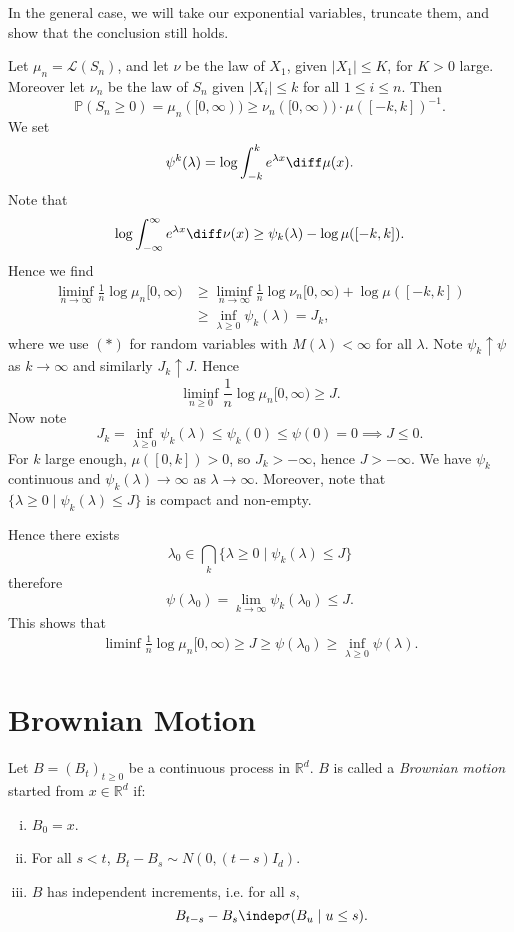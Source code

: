 \documentclass[12pt]{article}
\begin{document}
\begin{proofbox}
	In the general case, we will take our exponential variables, truncate them, and show that the conclusion still holds.

	Let $\mu_n = \mathcal{L}(S_n)$, and let $\nu$ be the law of $X_1$, given $|X_1| \leq K$, for $K > 0$ large. Moreover let $\nu_n$ be the law of $S_n$ given $|X_i| \leq k$ for all $1 \leq i \leq n$. Then
	\[
		\mathbb{P}(S_n \geq 0) = \mu_n([0, \infty)) \geq \nu_n([0, \infty)) \cdot \mu([-k, k])^{-1}.
	\]
	We set
	\[
	\psi^{k}(\lambda) = \log \int_{-k}^k e^{\lambda x} \diff \mu(x).
	\]
	Note that
	\[
		\log \int_{-\infty}^{\infty} e^{\lambda x} \diff \nu(x) \geq \psi_k(\lambda) - \log \mu([-k,k]).
	\]
	Hence we find
	\begin{align*}
		\liminf_{n \to \infty} \frac 1n \log \mu_n[0, \infty) &\geq \liminf_{n \to \infty} \frac 1n \log \nu_n [0, \infty) + \log \mu([-k, k]) \\
								      &\geq \inf_{\lambda \geq 0} \psi_k(\lambda) = J_k,
	\end{align*}
	where we use $(\ast)$ for random variables with $M(\lambda) < \infty$ for all $\lambda$. Note $\psi_k \uparrow \psi$ as $k \to \infty$ and similarly $J_k \uparrow J$. Hence
	\[
	\liminf_{n \geq 0} \frac 1n \log \mu_n[0, \infty) \geq J.
	\]
	Now note
	\[
	J_k = \inf_{\lambda \geq 0} \psi_k(\lambda) \leq \psi_k(0) \leq \psi(0) = 0 \implies J \leq 0.
	\]
	For $k$ large enough, $\mu([0, k]) > 0$, so $J_k > -\infty$, hence $J>  -\infty$. We have $\psi_k$ continuous and $\psi_k(\lambda) \to \infty$  as $\lambda \to \infty$. Moreover, note that $\{\lambda \geq 0 \mid \psi_k(\lambda) \leq J\}$ is compact and non-empty.

	Hence there exists
	\[
		\lambda_0 \in \bigcap_k \{ \lambda \geq 0 \mid \psi_k(\lambda) \leq J\}
	\]
	therefore
	\[
	\psi(\lambda_0) = \lim_{k \to \infty} \psi_k(\lambda_0) \leq J.
	\]
	This shows that
	\begin{align*}
		\liminf \frac 1n \log \mu_n[0, \infty) \geq J \geq \psi(\lambda_0) \geq \inf_{\lambda \geq 0} \psi(\lambda).
	\end{align*}
\end{proofbox}


\newpage

\section{Brownian Motion}%
\label{sec:b}

\begin{definition}
	Let $B = (B_t)_{t \geq 0}$ be a continuous process in $\mathbb{R}^{d}$. $B$ is called a \emph{Brownian motion} started from $x \in \mathbb{R}^{d}$ if:
	\begin{enumerate}[(i)]
		\item $B_0 = x$.
		\item For all $s < t$, $B_t - B_s \sim N(0, (t - s)I_d)$.
		\item $B$ has independent increments, i.e. for all $s$,
			\[
			B_{t - s} - B_s \indep \sigma(B_u \mid u \leq s).
			\]
	\end{enumerate}
\end{definition}
\end{document}
